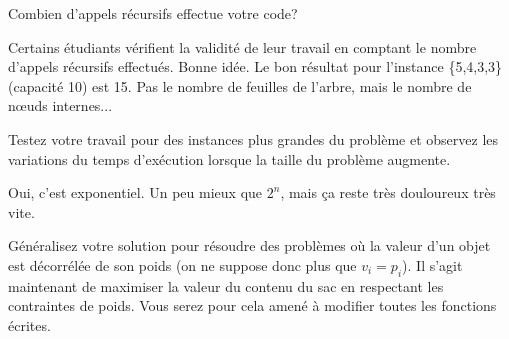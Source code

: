\documentclass[10pt]{article}\usepackage[correction,nu]{esial}
\begin{document}
\Question Combien d'appels récursifs effectue votre code?

\begin{Reponse}
  Certains étudiants  vérifient la validité de leur travail en comptant le
  nombre d'appels récursifs effectués. Bonne idée. Le bon résultat pour
  l'instance \{5,4,3,3\} (capacité 10) est 15. Pas
  le nombre de feuilles de l'arbre, mais le nombre de nœuds internes...
\end{Reponse}

\Question Testez votre travail pour des instances plus grandes du problème et
observez les variations du temps d'exécution lorsque la taille du problème
augmente.

\begin{Reponse}
  Oui, c'est exponentiel. Un peu mieux que $2^n$, mais ça reste très douloureux
  très vite.
\end{Reponse}

\Question Généralisez votre solution pour résoudre des problèmes où la valeur
d'un objet est décorrélée de son poids (on ne suppose donc plus que $v_i=p_i$).
Il s'agit maintenant de maximiser la valeur du contenu du sac en respectant les
contraintes de poids. Vous serez pour cela amené à modifier toutes les fonctions
écrites. 
\end{document}

